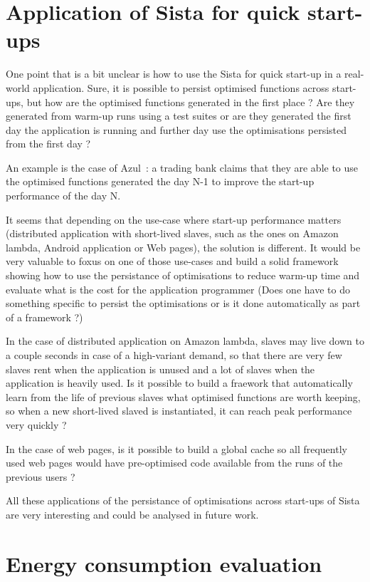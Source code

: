 \documentclass[a4paper,12pt,twoside]{../includes/ThesisStyle}
\begin{document}
\section{Application of Sista for quick start-ups}
\label{sec:useCase}

One point that is a bit unclear is how to use the Sista for quick start-up in a real-world application. Sure, it is possible to persist optimised functions across start-ups, but how are the optimised functions generated in the first place ? Are they generated from warm-up runs using a test suites or are they generated the first day the application is running and further day use the optimisations persisted from the first day ?

An example is the case of Azul~\cite{Azul}: a trading bank claims that they are able to use the optimised functions generated the day N-1 to improve the start-up performance of the day N. 

It seems that depending on the use-case where start-up performance matters (distributed application with short-lived slaves, such as the ones on Amazon lambda, Android application or Web pages), the solution is different. It would be very valuable to foxus on one of those use-cases and build a solid framework showing how to use the persistance of optimisations to reduce warm-up time and evaluate what is the cost for the application programmer (Does one have to do something specific to persist the optimisations or is it done automatically as part of a framework ?)

In the case of distributed application on Amazon lambda, slaves may live down to a couple seconds in case of a high-variant demand, so that there are very few slaves rent when the application is unused and a lot of slaves when the application is heavily used. Is it possible to build a fraework that automatically learn from the life of previous slaves what optimised functions are worth keeping, so when a new short-lived slaved is instantiated, it can reach peak performance very quickly ?

In the case of web pages, is it possible to build a global cache so all frequently used web pages would have pre-optimised code available from the runs of the previous users ?

All these applications of the persistance of optimisations across start-ups of Sista are very interesting and could be analysed in future work.

\section{Energy consumption evaluation}
\label{sec:energy}
\end{document}
